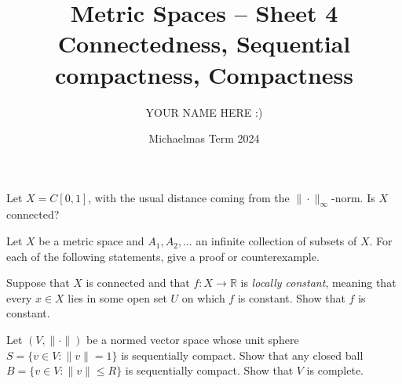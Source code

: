 \documentclass[answers]{exam}
\title{Metric Spaces -- Sheet 4\\Connectedness, Sequential compactness, Compactness}
\author{YOUR NAME HERE :)}
\date{Michaelmas Term 2024}
\begin{document}
\maketitle
\begin{questions}

\question%
Let $X=C[0,1]$, with the usual distance coming from the $\|\cdot\|_{\infty}$-norm. Is $X$ connected?



\question%
Let $X$ be a metric space and $A_{1}, A_{2}, \ldots$ an infinite collection of subsets of $X$. For each of the following statements, give a proof or counterexample.



\question%
Suppose that $X$ is connected and that $f: X \to \mathbb{R}$ is \emph{locally constant}, meaning that every $x \in X$ lies in some open set $U$ on which $f$ is constant. Show that $f$ is constant.



\question%
Let $(V,\|\cdot\|)$ be a normed vector space whose unit sphere $S=\{v \in V:\|v\|=1\}$ is sequentially compact. Show that any closed ball $B=\{v \in V:\|v\| \leqslant R\}$ is sequentially compact. Show that $V$ is complete.




\end{questions}
\end{document}
